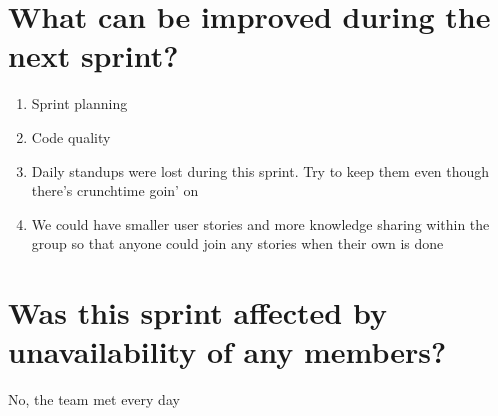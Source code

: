 \documentclass[11pt]{article}
\begin{document}
\section*{What can be improved during the next sprint?}
\begin{enumerate}
	\item Sprint planning
	\item Code quality
	\item Daily standups were lost during this sprint. Try to keep them even though there’s crunchtime goin’ on
	\item We could have smaller user stories and more knowledge sharing within the group so that anyone could join any stories when their own is done
\end{enumerate} 


\section*{Was this sprint affected by unavailability of any members?}
No, the team met every day
\end{document}
